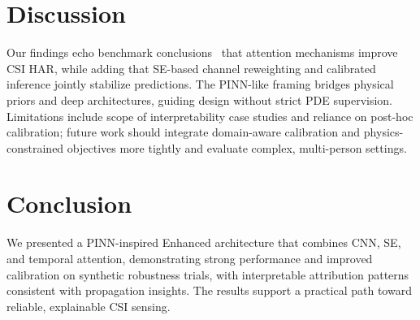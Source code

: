 \documentclass[journal]{IEEEtran}
\begin{document}
\section{Discussion}
Our findings echo benchmark conclusions~\cite{yang2023sensefi} that attention mechanisms improve CSI HAR, while adding that SE-based channel reweighting and calibrated inference jointly stabilize predictions. The PINN-like framing bridges physical priors and deep architectures, guiding design without strict PDE supervision. Limitations include scope of interpretability case studies and reliance on post-hoc calibration; future work should integrate domain-aware calibration and physics-constrained objectives more tightly and evaluate complex, multi-person settings.

\section{Conclusion}
We presented a PINN-inspired Enhanced architecture that combines CNN, SE, and temporal attention, demonstrating strong performance and improved calibration on synthetic robustness trials, with interpretable attribution patterns consistent with propagation insights. The results support a practical path toward reliable, explainable CSI sensing.



\end{document}
